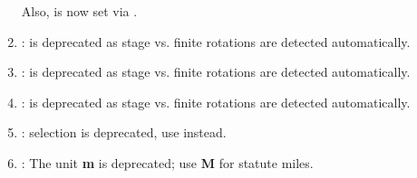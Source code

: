 \begin{enumerate}
		Also,  is now set via .
	\item {}:  is deprecated as stage vs. finite rotations are detected automatically.
	\item {}:  is deprecated as stage vs. finite rotations are detected automatically.
	\item {}:  is deprecated as stage vs. finite rotations are detected automatically.
	\item {}:  selection is deprecated, use  instead.
	\item {}: The unit {\bf m} is deprecated; use {\bf M} for statute miles.
\end{enumerate}

